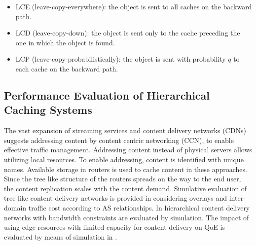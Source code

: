 \begin{itemize}
  \item LCE (leave-copy-everywhere): the object is sent to all caches on the backward path.
  \item LCD (leave-copy-down): the object is sent only to the cache preceding the one in which the object is found.
  \item LCP (leave-copy-probabilistically): the object is sent with probability $q$ to each cache on the backward path.
\end{itemize}

\subsection{Performance Evaluation of Hierarchical Caching Systems}
The vast expansion of streaming services and content delivery networks (CDNs) suggests addressing content by content centric networking (CCN), to enable effective traffic management.
Addressing content instead of physical servers allows utilizing local resources.
To enable addressing, content is identified with unique names.
Available storage in routers is used to cache content in these approaches.
Since the tree like structure of the routers spreads on the way to the end user, the content replication scales with the content demand.
Simulative evaluation of tree like content delivery networks is provided in \cite{lareida2015augmenting} considering overlays and inter-domain traffic cost according to AS relationships.
In \cite{applegate2010optimal} hierarchical content delivery networks with bandwidth constraints are evaluated by simulation. The impact of using edge resources with limited capacity for content delivery on QoE is evaluated by means of simulation in \cite{info3-inproceedings-2015-530}.

